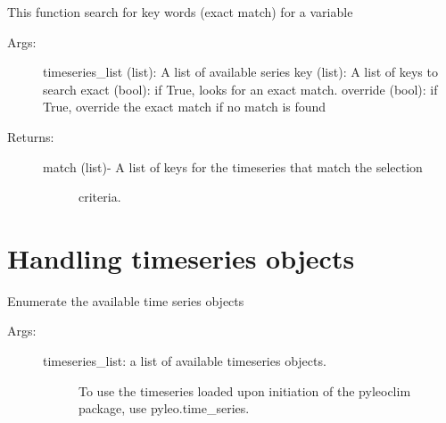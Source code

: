 \documentclass[letterpaper,10pt,english]{sphinxmanual}
\begin{document}
\begin{fulllineitems}
\label{\detokenize{LIPDutils:pyleoclim.LipdUtils.searchVar}}
This function search for key words (exact match) for a variable
\begin{description}
\item[{Args:}] \leavevmode
timeseries\_list (list): A list of available series
key (list): A list of keys to search
exact (bool): if True, looks for an exact match.
override (bool): if True, override the exact match if no match is found

\item[{Returns:}] \leavevmode\begin{description}
\item[{match (list)- A list of keys for the timeseries that match the selection}] \leavevmode
criteria.

\end{description}

\end{description}

\end{fulllineitems}



\section{Handling timeseries objects}
\label{\detokenize{LIPDutils:handling-timeseries-objects}}

\begin{fulllineitems}
\label{\detokenize{LIPDutils:pyleoclim.LipdUtils.enumerateTs}}
Enumerate the available time series objects
\begin{description}
\item[{Args:}] \leavevmode\begin{description}
\item[{timeseries\_list: a  list of available timeseries objects. }] \leavevmode
To use the timeseries loaded upon initiation of the 
pyleoclim package, use pyleo.time\_series.

\end{description}

\end{description}

\end{fulllineitems}
\end{document}
